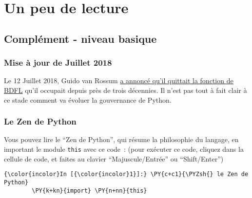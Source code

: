     
    
    
    

    

    \hypertarget{un-peu-de-lecture}{%
\section{Un peu de lecture}\label{un-peu-de-lecture}}

    \hypertarget{compluxe9ment---niveau-basique}{%
\subsection{Complément - niveau
basique}\label{compluxe9ment---niveau-basique}}

    \hypertarget{mise-uxe0-jour-de-juillet-2018}{%
\subsubsection{Mise à jour de Juillet
2018}\label{mise-uxe0-jour-de-juillet-2018}}

    Le 12 Juillet 2018, Guido van Rossum
\href{https://lwn.net/Articles/759654/}{a annoncé qu'il quittait la
fonction de BDFL} qu'il occupait depuis près de trois décennies. Il
n'est pas tout à fait clair à ce stade comment va évoluer la gouvernance
de Python.

    \hypertarget{le-zen-de-python}{%
\subsubsection{Le Zen de Python}\label{le-zen-de-python}}

    Vous pouvez lire le ``Zen de Python'', qui résume la philosophie du
langage, en important le module \texttt{this} avec ce code~: (pour
exécuter ce code, cliquez dans la cellule de code, et faites au clavier
``Majuscule/Entrée'' ou ``Shift/Enter'')

    \begin{Verbatim}[commandchars=\\\{\}]
{\color{incolor}In [{\color{incolor}1}]:} \PY{c+c1}{\PYZsh{} le Zen de Python}
        \PY{k+kn}{import} \PY{n+nn}{this}
\end{Verbatim}


